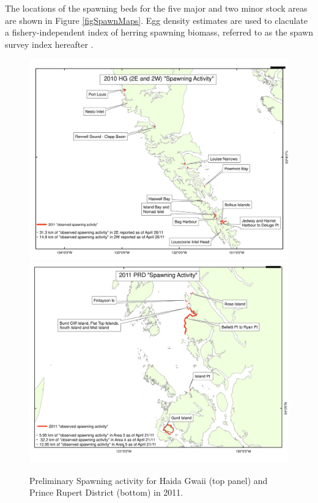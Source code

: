 The locations of the spawning beds for the five major and two minor stock areas are shown in Figure \ref{figSpawnMaps}.  Egg density estimates are used to claculate a fishery-independent index of herring spawning biomass, referred to as the spawn survey index hereafter \citep{schweigert2001stock}.

\begin{figure}[!tbp]
	\centering
	\includegraphics[scale=0.5]{../Figs/PBSfigs/2011-HG-Prelim-WG.pdf}\\
	\includegraphics[scale=0.5]{../Figs/PBSfigs/2011-PRD-Prelim-WG.pdf}
	\caption{Preliminary Spawning activity for Haida Gwaii (top panel) and Prince Rupert District (bottom) in 2011.}
\end{figure}
